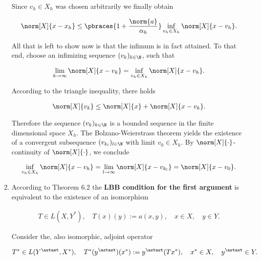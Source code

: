 \begin{solution}
\begin{enumerate}[label = \textbf{\alph*)}]
  Since $v_h \in X_h$ was chosen arbitrarily we finally obtain

  \begin{align*}
    \norm[X]{x - x_h}
    \leq
    \pbraces{1 + \frac{\norm{a}}{\alpha_h}} \inf_{v_h \in X_h} \norm[X]{x - v_h}.
  \end{align*}

  All that is left to show now is that the infimum is in fact attained.
  To that end, choose an infimizing sequence $(v_k)_{k \in \N}$, such that

  \begin{align*}
    \lim_{k \to \infty} \norm[X]{x - v_k}
    =
    \inf_{v_h \in X_h} \norm[X]{x - v_h}.
  \end{align*}

  According to the triangle inequality, there holds
  
  \begin{align*}
    \norm[X]{v_k}
    \leq
    \norm[X]{x} + \norm[X]{x - v_k}.
  \end{align*}

  Therefore the sequence $(v_k)_{k \in \N}$ is a bounded sequence in the finite dimensional space $X_h$.
  The Bolzano-Weierstrass theorem yields the existence of a convergent subsequence $(v_{k_l})_{l \in \N}$ with limit $v_0 \in X_h$.
  By $\norm[X]{\cdot}$-continuity of $\norm[X]{\cdot}$, we conclude

  \begin{align*}
    \inf_{v_h \in X_h} \norm[X]{x - v_h}
    =
    \lim_{l \to \infty} \norm[X]{x - v_{k_l}}
    =
    \norm[X]{x - v_0}.
  \end{align*}

  \item According to Theorem 6.2 the \textbf{LBB condition for the first argument} is equivalent to the existence of an isomorphism

  \begin{align*}
    T \in L(X, Y^\ast),
    \quad
    T(x)(y) := a(x, y),
    \quad
    x \in X,
    \quad
    y \in Y.
  \end{align*}


  Consider the, also isomorphic, adjoint operator

  \begin{align*}
    T^\ast \in L(Y^\astast, X^\ast),
    \quad
    T^\ast(y^\astast)(x^\ast) := y^\astast(T x^\ast),
    \quad
    x^\ast \in X,
    \quad
    y^\astast \in Y.
  \end{align*}


\end{enumerate}
\end{solution}
